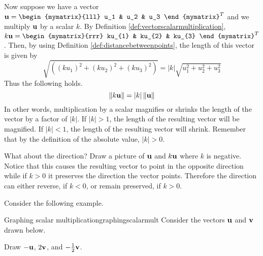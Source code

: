 Now suppose we have a vector $\vect{u} = \begin{mymatrix}{lll}
u_1 &  u_2 & u_3 
\end{mymatrix}^T$ and we multiply ${\bf u}$ by a
scalar $k$. By Definition \ref{def:vectorscalarmultiplication},
$k\vect{u} = \begin{mymatrix}{rrr}
ku_{1} & ku_{2} & ku_{3}
\end{mymatrix}^T $. 
Then, by using Definition \ref{def:distancebetweenpoints}, the length of this vector is given by 
\begin{equation*}
\sqrt{\left( \left( k u_{1}\right) ^{2}+\left( k u_{2}\right)
^{2}+\left( k u_{3}\right) ^{2}\right) }=\left\vert k \right\vert
\sqrt{u_{1}^{2}+u_{2}^{2}+u_{3}^{2}}
\end{equation*}
Thus the following holds.
\begin{equation*}
\| k {\bf u} \| =\left\vert k \right\vert
\| {\bf u} \| 
\end{equation*}
In other words, multiplication by a scalar magnifies or shrinks the length
of the vector by a factor of $\left\vert k \right\vert$. If $\left\vert k \right\vert > 1$, the length of the resulting vector will 
be magnified. If $\left\vert k \right\vert <1$, the length of the resulting vector will shrink. Remember that by the definition 
of the absolute value, $\left\vert k \right\vert >0$. 

What about the direction? Draw a picture of ${\bf u}$ and $k{\bf u}$
where $k$ is negative. Notice that this causes the resulting vector
to point in the opposite direction while if $k >0$ it preserves the
direction the vector points. Therefore the direction can either
reverse, if $k < 0$, or remain preserved, if $k > 0$.

Consider the following example.

\begin{example}{Graphing scalar multiplication}{graphingscalarmult}
Consider the vectors ${\bf u}$ and ${\bf v}$ drawn below. 

\begin{center}
\end{center}

Draw  $-{\bf u}$, $2{\bf v}$, and $-\frac{1}{2}{\bf v}$.
\end{example}

